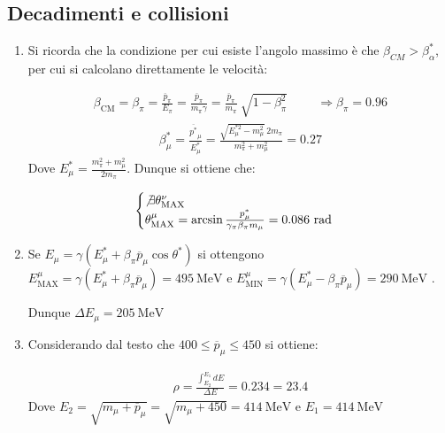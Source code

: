 \documentclass[12pt,twoside,a4]{article}
\begin{document}
\newpage
{}
\subsection{Decadimenti e collisioni}
\begin{solution}
\vspace{-1cm}
\begin{enumerate}[label=(\textit{\roman*})]
\item Si ricorda che la condizione per cui esiste l'angolo massimo è che $\beta_{CM} > \beta^{\ast}_{\alpha}$, per cui si calcolano direttamente le velocità:
 
 	\begin{gather*}
     \beta_\mathrm{CM} = \beta_\pi = \frac{\overline{p}_\pi}{E_\pi} =  \frac{\overline{p}_\pi}{m_\pi \gamma} = \frac{\overline{p}_\pi}{m_\pi} \ \sqrt{1 - \beta^2_\pi} \hspace{1cm}
     \Rightarrow  \boxed{\beta_\pi = 0.96}
 	\end{gather*}
 	\begin{gather*}
     \beta^\ast_\mu = \frac{\overline{p^\ast}_\mu}{E^\ast_\mu} = \frac{\sqrt{E^{\ast 2}_\mu - m^2_\mu} \ 2 m_\pi}{m^2_\pi + m^2_\mu} = 0.27
 	\end{gather*}
     Dove  $E^\ast_\mu = \frac{m^2_\pi + m^2_\mu}{2 m_\pi} $. Dunque si ottiene che:
	
	\begin{equation*}
	    \begin{cases}
	    \not\exists \theta^\nu_\mathrm{MAX} \\
	    \theta^\mu_\mathrm{MAX} = \arcsin{\frac{p^\ast_\mu}{\gamma_\pi \beta_\pi m_\mu}} = 0.086 \ \mathrm{rad}
	    \end{cases}
	\end{equation*}
	 
	\item Se $E_\mu = \gamma (E^\ast_\mu + \beta_\pi \overline{p}_\mu \cos{\theta^\ast})$ si ottengono $E^\mu_\mathrm{MAX} = \gamma (E^\ast_\mu + \beta_\pi \overline{p}_\mu) = 495 \ \mathrm{MeV}$ e $E^\mu_\mathrm{MIN} = \gamma (E^\ast_\mu - \beta_\pi \overline{p}_\mu) = 290 \ \mathrm{MeV}$ . 
 
	Dunque $\Delta E_\mu = 205 \ \mathrm{MeV}$

	\item Considerando dal testo che $ 400 \le \overline{p}_\mu \le 450$ si ottiene: 
 	
 	\begin{gather*}
	     \rho = \frac{\int_{E_2}^{E_1} dE}{\Delta E} = 0.234 = 23.4 
	\end{gather*}
	Dove $E_2 = \sqrt{m_\mu + \overline{p}_\mu} = \sqrt{m_\mu + 450} = 414 \ \mathrm{MeV}$ e $
	     E_1 = 414 \ \mathrm{MeV}$
\end{enumerate}
\end{solution}
\end{document}
